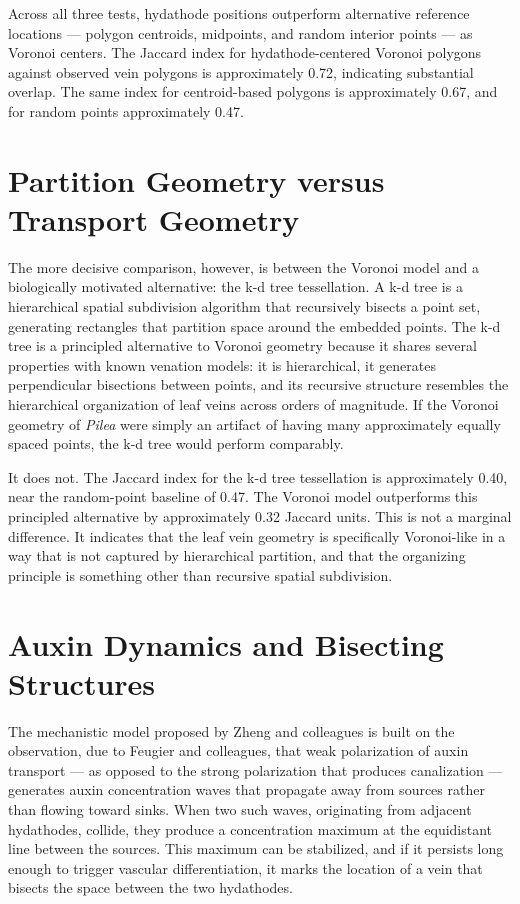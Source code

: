 \documentclass[12pt, a4paper, openany]{book}
\theoremstyle{definition}
\theoremstyle{remark}
\begin{document}
Across all three tests, hydathode positions outperform alternative reference locations — polygon centroids, midpoints, and random interior points — as Voronoi centers. The Jaccard index for hydathode-centered Voronoi polygons against observed vein polygons is approximately 0.72, indicating substantial overlap. The same index for centroid-based polygons is approximately 0.67, and for random points approximately 0.47.

\section{Partition Geometry versus Transport Geometry}

The more decisive comparison, however, is between the Voronoi model and a biologically motivated alternative: the k-d tree tessellation. A k-d tree is a hierarchical spatial subdivision algorithm that recursively bisects a point set, generating rectangles that partition space around the embedded points. The k-d tree is a principled alternative to Voronoi geometry because it shares several properties with known venation models: it is hierarchical, it generates perpendicular bisections between points, and its recursive structure resembles the hierarchical organization of leaf veins across orders of magnitude. If the Voronoi geometry of \textit{Pilea} were simply an artifact of having many approximately equally spaced points, the k-d tree would perform comparably.

It does not. The Jaccard index for the k-d tree tessellation is approximately 0.40, near the random-point baseline of 0.47. The Voronoi model outperforms this principled alternative by approximately 0.32 Jaccard units. This is not a marginal difference. It indicates that the leaf vein geometry is specifically Voronoi-like in a way that is not captured by hierarchical partition, and that the organizing principle is something other than recursive spatial subdivision.

\section{Auxin Dynamics and Bisecting Structures}

The mechanistic model proposed by Zheng and colleagues is built on the observation, due to Feugier and colleagues, that weak polarization of auxin transport — as opposed to the strong polarization that produces canalization — generates auxin concentration waves that propagate away from sources rather than flowing toward sinks. When two such waves, originating from adjacent hydathodes, collide, they produce a concentration maximum at the equidistant line between the sources. This maximum can be stabilized, and if it persists long enough to trigger vascular differentiation, it marks the location of a vein that bisects the space between the two hydathodes.
\end{document}
